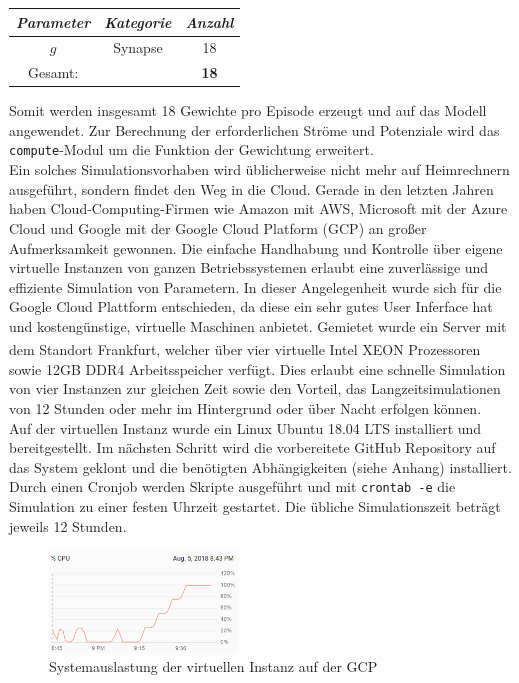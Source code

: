 		\begin{center}
			\begin{tabular}{c@{\hskip 0.5cm}c@{\hskip 0.5cm}c@{\hskip 0.5cm}}    \toprule
				\setlength{\tabcolsep}{50pt}
				\renewcommand{\arraystretch}{1.5}
				\emph{Parameter}	& \emph{Kategorie}  & \emph{Anzahl} \\\midrule
				$g$					& Synapse			& 18			\\\bottomrule
				Gesamt:				&					& \textbf{18}	\\
				\hline
			\end{tabular}
		\end{center}
		Somit werden insgesamt 18 Gewichte pro Episode erzeugt und auf das Modell angewendet. Zur Berechnung der erforderlichen Ströme und Potenziale wird das \texttt{compute}-Modul um die Funktion der Gewichtung erweitert.\\
		Ein solches Simulationsvorhaben wird üblicherweise nicht mehr auf Heimrechnern ausgeführt, sondern findet den Weg in die Cloud. Gerade in den letzten Jahren haben Cloud-Computing-Firmen wie Amazon mit AWS, Microsoft mit der Azure Cloud und Google mit der Google Cloud Platform (GCP) an großer Aufmerksamkeit gewonnen. Die einfache Handhabung und Kontrolle über eigene virtuelle Instanzen von ganzen Betriebssystemen erlaubt eine zuverlässige und effiziente Simulation von Parametern. In dieser Angelegenheit wurde sich für die Google Cloud Plattform entschieden, da diese ein sehr gutes User Inferface hat und kostengünstige, virtuelle Maschinen anbietet. Gemietet wurde ein Server mit dem Standort Frankfurt, welcher über vier virtuelle Intel XEON\textsuperscript{\textregistered} Prozessoren sowie 12GB DDR4 Arbeitsspeicher verfügt. Dies erlaubt eine schnelle Simulation von vier Instanzen zur gleichen Zeit sowie den Vorteil, das Langzeitsimulationen von 12 Stunden oder mehr im Hintergrund oder über Nacht erfolgen können.\\
		Auf der virtuellen Instanz wurde ein Linux Ubuntu 18.04 LTS installiert und bereitgestellt. Im nächsten Schritt wird die vorbereitete GitHub Repository \cite{BA} auf das System geklont und die benötigten Abhängigkeiten (siehe Anhang) installiert. Durch einen Cronjob werden Skripte ausgeführt und mit \texttt{crontab -e} die Simulation zu einer festen Uhrzeit gestartet. Die übliche Simulationszeit beträgt jeweils 12 Stunden.
		\begin{figure}[!h] %
			\centering
			\includegraphics[width=5cm]{figures/chap_implement/GCP.png}
			\caption{Systemauslastung der virtuellen Instanz auf der GCP}
			\label{fig:gcp_1}
		\end{figure}\\
